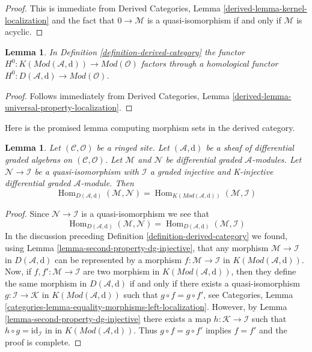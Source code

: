 \documentclass{stacks-project}
\theoremstyle{plain}
\newtheorem{lemma}[subsection]{Lemma}
\theoremstyle{definition}
\theoremstyle{remark}
\numberwithin{equation}{subsection}
\def\Hom{\mathop{\mathrm{Hom}}\nolimits}
\begin{document}
\begin{proof}
This is immediate from
Derived Categories, Lemma \ref{derived-lemma-kernel-localization}
and the fact that $0 \to \mathcal{M}$ is a quasi-isomorphism
if and only if $\mathcal{M}$ is acyclic.
\end{proof}

\begin{lemma}
\label{lemma-H0-over-D}
In Definition \ref{definition-derived-category} the functor
$H^0 : K(\textit{Mod}(\mathcal{A}, \text{d})) \to
\textit{Mod}(\mathcal{O})$ factors through a homological functor
$H^0 : D(\mathcal{A}, \text{d}) \to \textit{Mod}(\mathcal{O})$.
\end{lemma}

\begin{proof}
Follows immediately from
Derived Categories, Lemma \ref{derived-lemma-universal-property-localization}.
\end{proof}

\noindent
Here is the promised lemma computing morphism sets in the
derived category.

\begin{lemma}
\label{lemma-hom-derived}
Let $(\mathcal{C}, \mathcal{O})$ be a ringed site. Let
$(\mathcal{A}, \text{d})$ be a sheaf of differential graded algebras
on $(\mathcal{C}, \mathcal{O})$.
Let $\mathcal{M}$ and $\mathcal{N}$ be differential graded
$\mathcal{A}$-modules. Let $\mathcal{N} \to \mathcal{I}$ be a
quasi-isomorphism with $\mathcal{I}$ a graded injective and
K-injective differential graded $\mathcal{A}$-module. Then
$$
\Hom_{D(\mathcal{A}, \text{d})}(\mathcal{M}, \mathcal{N}) =
\Hom_{K(\textit{Mod}(\mathcal{A}, \text{d}))}(\mathcal{M}, \mathcal{I})
$$
\end{lemma}

\begin{proof}
Since $\mathcal{N} \to \mathcal{I}$ is a quasi-isomorphism
we see that
$$
\Hom_{D(\mathcal{A}, \text{d})}(\mathcal{M}, \mathcal{N}) =
\Hom_{D(\mathcal{A}, \text{d})}(\mathcal{M}, \mathcal{I})
$$
In the discussion preceding Definition \ref{definition-derived-category}
we found, using Lemma \ref{lemma-second-property-dg-injective},
that any morphism $\mathcal{M} \to \mathcal{I}$
in $D(\mathcal{A}, \text{d})$ can be represented by a morphism
$f : \mathcal{M} \to \mathcal{I}$ in
$K(\textit{Mod}(\mathcal{A}, \text{d}))$.
Now, if $f, f' :  \mathcal{M} \to \mathcal{I}$ are two morphism in
$K(\textit{Mod}(\mathcal{A}, \text{d}))$, then they define
the same morphism in $D(\mathcal{A}, \text{d})$ if and only
if there exists a quasi-isomorphism $g : \mathcal{I} \to \mathcal{K}$
in $K(\textit{Mod}(\mathcal{A}, \text{d}))$
such that $g \circ f = g \circ f'$, see
Categories, Lemma \ref{categories-lemma-equality-morphisms-left-localization}.
However, by Lemma \ref{lemma-second-property-dg-injective} there
exists a map
$h : \mathcal{K} \to \mathcal{I}$
such that $h \circ g = \text{id}_\mathcal{I}$ in
in $K(\textit{Mod}(\mathcal{A}, \text{d}))$.
Thus $g \circ f = g \circ f'$ implies $f = f'$ and
the proof is complete.
\end{proof}
\end{document}
